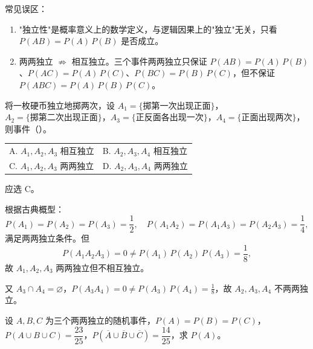 ﻿\documentclass[lang=cn,11pt]{elegantbook}
\begin{document}
\begin{note}
常见误区：
\begin{enumerate}
    \item "独立性"是概率意义上的数学定义，与逻辑因果上的"独立"无关，只看 \(P(AB)=P(A)\,P(B)\) 是否成立。
    \item 两两独立 \(\nRightarrow\) 相互独立。三个事件两两独立只保证 \(P(AB)=P(A)\,P(B)\)、\(P(AC)=P(A)\,P(C)\)、\(P(BC)=P(B)\,P(C)\)，但不保证 \(P(ABC)=P(A)\,P(B)\,P(C)\)。
\end{enumerate}
\end{note}

\begin{exercise}\label{exer:1-17}
将一枚硬币独立地掷两次，设 \(A_1=\{\text{掷第一次出现正面}\}\)，\(A_2=\{\text{掷第二次出现正面}\}\)，\(A_3=\{\text{正反面各出现一次}\}\)，\(A_4=\{\text{正面出现两次}\}\)，则事件（\quad）。\par
\begin{tabular}{ll}
A. \(A_1,A_2,A_3\) 相互独立 & B. \(A_2,A_3,A_4\) 相互独立 \\[4pt]
C. \(A_1,A_2,A_3\) 两两独立 & D. \(A_2,A_3,A_4\) 两两独立
\end{tabular}
\end{exercise}

\begin{solution}
应选 C。

根据古典概型：
\[
P(A_1)=P(A_2)=P(A_3)=\frac{1}{2}, \quad P(A_1A_2)=P(A_1A_3)=P(A_2A_3)=\frac{1}{4},
\]
满足两两独立条件。但
\[
P(A_1A_2A_3)=0 \neq P(A_1)\,P(A_2)\,P(A_3)=\frac{1}{8},
\]
故 \(A_1, A_2, A_3\) 两两独立但不相互独立。

又 \(A_3 \cap A_4 = \varnothing\)，\(P(A_3A_4)=0 \neq P(A_3)\,P(A_4)=\frac{1}{8}\)，故 \(A_2, A_3, A_4\) 不两两独立。
\end{solution}

\begin{exercise}\label{exer:1-18}
设 \(A, B, C\) 为三个两两独立的随机事件，\(P(A)=P(B)=P(C)\)，\(P(A \cup B \cup C)=\dfrac{23}{25}\)，\(P(\overline{A} \cup \overline{B} \cup \overline{C})=\dfrac{14}{25}\)，求 \(P(A)\)。
\end{exercise}
\end{document}
